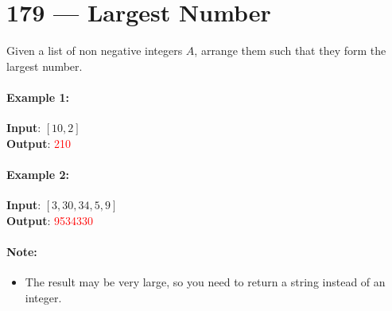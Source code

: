 \section{179 --- Largest Number}
Given a list of non negative integers $A$, arrange them such that they form the largest number.
\paragraph{Example 1:}
\begin{flushleft}
\textbf{Input}: $[10,2]$
\\
\textbf{Output}: \textcolor{red}{210}
\end{flushleft}
\paragraph{Example 2:}
\begin{flushleft}
\textbf{Input}: $[3,30,34,5,9]$
\\
\textbf{Output}: \textcolor{red}{9534330}
\end{flushleft}
\paragraph{Note:} 
\begin{itemize}
\item The result may be very large, so you need to return a string instead of an integer.
\end{itemize}
